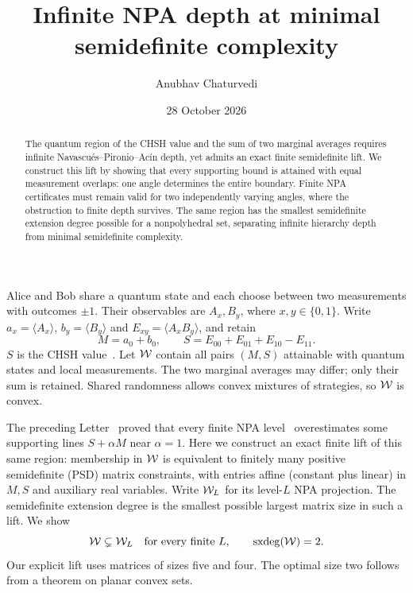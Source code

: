 \documentclass[aps,prl,reprint,superscriptaddress,nofootinbib,longbibliography]{revtex4-2}
\newcommand{\sxdeg}{\operatorname{sxdeg}}
\begin{document}
\raggedbottom
\title{Infinite NPA depth at minimal semidefinite complexity}
\author{Anubhav Chaturvedi}
\date{28 October 2026}
\begin{abstract}
The quantum region of the CHSH value and the sum of two marginal averages requires infinite Navascués–Pironio–Acín depth, yet admits an exact finite semidefinite lift. We construct this lift by showing that every supporting bound is attained with equal measurement overlaps: one angle determines the entire boundary. Finite NPA certificates must remain valid for two independently varying angles, where the obstruction to finite depth survives. The same region has the smallest semidefinite extension degree possible for a nonpolyhedral set, separating infinite hierarchy depth from minimal semidefinite complexity.
\end{abstract}
\maketitle

Alice and Bob share a quantum state and each choose between two
measurements with outcomes $\pm1$. Their observables are $A_x,B_y$,
where $x,y\in\{0,1\}$. Write $a_x=\langle A_x\rangle$, $b_y=\langle B_y\rangle$ and
$E_{xy}=\langle A_xB_y\rangle$, and retain
\begin{equation}
 M=a_0+b_0,\qquad S=E_{00}+E_{01}+E_{10}-E_{11}.
 \label{eq:observed}
\end{equation}
$S$ is the CHSH value~\cite{CHSH}. Let $\mathcal W$ contain all pairs $(M,S)$
attainable with quantum states and local measurements. The two marginal
averages may differ; only their sum is retained. Shared randomness allows
convex mixtures of strategies, so $\mathcal W$ is convex.

The preceding Letter~\cite{prior} proved that every finite NPA
level~\cite{NPA2007,NPA2008} overestimates some supporting lines
$S+\alpha M$ near $\alpha=1$. Here we construct an exact finite lift
of this same region: membership in $\mathcal W$ is equivalent to finitely many
positive semidefinite (PSD) matrix constraints, with entries affine
(constant plus linear) in $M,S$ and auxiliary real variables.
Write $\mathcal W_L$ for its level-$L$ NPA projection. The semidefinite extension
degree is the smallest possible largest matrix size in such a lift. We show
\begin{equation}
 \W\subsetneq\W_L\quad\text{for every finite }L,
 \qquad \sxdeg(\W)=2.
 \label{eq:result}
\end{equation}
Our explicit lift uses matrices of sizes five and four. The optimal
size two follows from a theorem on planar convex sets.
\end{document}
